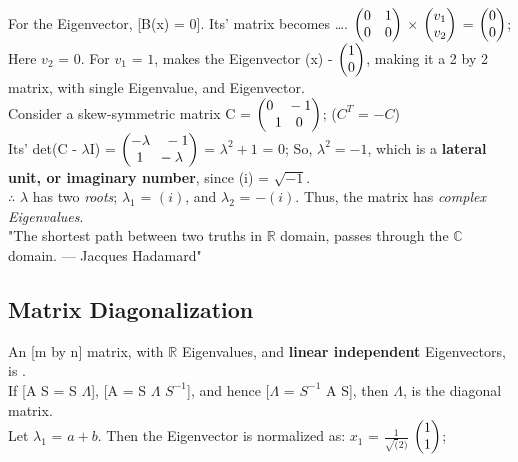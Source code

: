 \documentclass[a4paper, 10pt, onepage]{elegantbook}
\begin{document}
For the Eigenvector, [B(x) = 0]. Its' matrix becomes \ldots. $\begin{pmatrix}0 \quad 1 \cr 0 \quad 0 \end{pmatrix}$ $\times$ $\begin{pmatrix}v_1 \cr v_2 \end{pmatrix}$ = $\begin{pmatrix}0 \cr 0 \end{pmatrix}$; Here $v_2$ = $0$. For $v_1$ = $1$, makes the Eigenvector (x) - $\begin{pmatrix}1 \cr 0 \end{pmatrix}$, making it a 2 by 2 matrix, with single Eigenvalue, and Eigenvector. \\

Consider a skew-symmetric matrix C = $\begin{pmatrix}0 \quad -1 \cr 1 \quad 0 \end{pmatrix}$; ($C^T$ = $-C$)  \\

Its' det(C - $\lambda$I) = $\begin{pmatrix} - \lambda \quad -1 \cr 1 \quad - \lambda \end{pmatrix}$ = $\lambda^2 + 1$ = $0$; So, $\boxed{\lambda^2 = -1}$, which is a \textbf{lateral unit, or imaginary number}, since (i) = $\sqrt{-1}$.  \\

$\therefore$ $\lambda$ has two \emph{roots}; $\lambda_1$ = $(i)$, and $\lambda_2$ = $ - (i)$. Thus, the matrix has \emph{complex Eigenvalues}.  \\

"The shortest path between two truths in $\mathbb{R}$ domain, passes through the $\mathbb{C}$ domain. --- Jacques Hadamard"

\subsection{Matrix Diagonalization}

An [m by n] matrix, with $\mathbb{R}$ Eigenvalues, and \textbf{linear independent} Eigenvectors, is .  \\

If [A S = S $\Lambda$], [A = S $\Lambda$ $S^{-1}$], and hence [$\Lambda$ = $S^{-1}$ A S], then $\Lambda$, is the diagonal matrix.  \\

Let $\lambda_1$ = $a + b$. Then the Eigenvector is normalized as: $x_1$ = $\frac{1}{\sqrt(2)}$ $\begin{pmatrix}1 \cr 1 \end{pmatrix}$; \\
\end{document}
